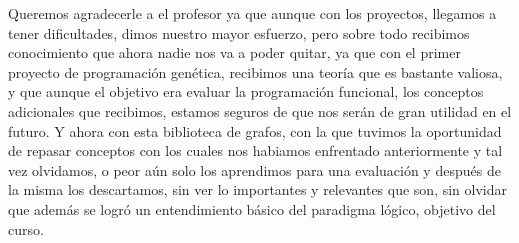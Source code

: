 \documentclass[10pt,a4paper]{article}
\begin{document}
Queremos agradecerle a el profesor ya que aunque con los proyectos, llegamos a tener dificultades, dimos nuestro mayor esfuerzo, pero sobre todo recibimos conocimiento que ahora nadie nos va a poder quitar, ya que con el primer proyecto de programación genética, recibimos una teoría que es bastante valiosa, y que aunque el objetivo era evaluar la programación funcional, los conceptos adicionales que recibimos, estamos seguros de que nos serán de gran utilidad en el futuro. Y ahora con esta biblioteca de grafos, con la que tuvimos la oportunidad de repasar conceptos con los cuales nos habiamos enfrentado anteriormente y tal vez olvidamos, o peor aún solo los aprendimos para una evaluación y después de la misma los descartamos, sin ver lo importantes y relevantes que son, sin olvidar que además se logró un entendimiento básico del paradigma lógico, objetivo del curso.\\
\pagebreak


\end{document}
